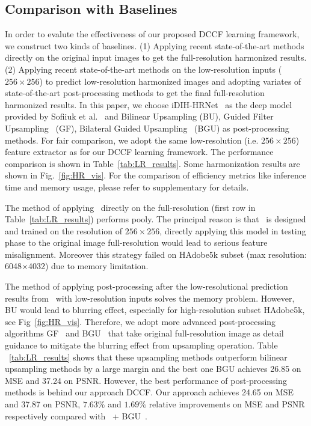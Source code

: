 \documentclass[runningheads]{llncs}
\begin{document}
    \subsection{Comparison with Baselines}
    In order to evalute the effectiveness of our proposed DCCF learning framework, we construct two kinds of baselines. (1) Applying recent state-of-the-art methods directly on the original input images to get the full-resolution harmonized results.
    (2) Applying recent state-of-the-art methods on the low-resolution inputs ($256\times256$) to predict low-resolution harmonized images  and adopting variates of state-of-the-art post-processing methods to get the final full-resolution harmonized results.
    In this paper, we choose iDIH-HRNet~\cite{sofiiuk2021foreground} as the deep model provided by Sofiiuk et al.~\cite{sofiiuk2021foreground} and Bilinear Upsampling (BU), Guided Filter Upsampling~\cite{hekaiming2013GF} (GF), Bilateral Guided Upsampling~\cite{chen2016bilateral} (BGU) as post-processing methods.
    For fair comparison, we adopt the same low-resolution (i.e. $256\times256$) feature extractor as \cite{sofiiuk2021foreground} for our DCCF learning framework.
    The performance comparison is shown in Table~\ref{tab:LR_results}. Some harmonization results are shown in Fig.~\ref{fig:HR_vis}. For the comparison of efficiency metrics like inference time and memory usage, please refer to supplementary for details.
    

    The method of applying~\cite{sofiiuk2021foreground} directly on the full-resolution (first row in Table~\ref{tab:LR_results}) performs pooly.
    The principal reason is that~\cite{sofiiuk2021foreground} is designed and trained on the resolution of $256\times256$, directly applying this model in testing phase to the original image full-resolution would lead to serious feature misalignment.
    Moreover this strategy failed on HAdobe5k subset (max resolution: 6048$\times$4032) due to memory limitation.

    The method of applying post-processing after the low-resolutional prediction results from~\cite{sofiiuk2021foreground} with low-resolution inputs solves the memory problem.
However, BU would lead to blurring effect, especially for high-resolution subset HAdobe5k, see Fig~\ref{fig:HR_vis}.
    Therefore, we adopt more advanced post-processing algorithms GF~\cite{hekaiming2013GF} and BGU~\cite{chen2016bilateral} that take original full-resolution image as detail guidance to mitigate the blurring effect from upsampling operation.
    Table ~\ref{tab:LR_results} shows that these upsampling methods outperform bilinear upsampling methods by a large margin and the best one BGU\cite{chen2016bilateral} achieves 26.85 on MSE and 37.24 on PSNR.
    However, the best performance of post-processing methods is behind our approach DCCF.
    Our approach achieves 24.65 on MSE and 37.87 on PSNR, $7.63\%$ and $1.69\%$ relative improvements on MSE and PSNR respectively compared with ~\cite{sofiiuk2021foreground}+ BGU~\cite{chen2016bilateral}.
\end{document}
